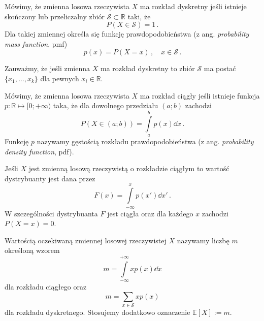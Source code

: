 \documentclass{myclass}
\numberwithin{equation}{section}
\begin{document}
\begin{definition}
Mówimy, że zmienna losowa rzeczywista \(X\) ma rozkład dyskretny jeśli istnieje skończony lub
przeliczalny zbiór \(\mathcal{S} \subset \mathbb{R}\) taki, że
\begin{equation*}
    P( X \in \mathcal{S} ) = 1\,.
\end{equation*}
Dla takiej zmiennej określa się funkcję prawdopodobieństwa (z ang. \textit{probability mass
function}, pmf)
\begin{equation*}
    p(x) = P(X = x)\,,\quad x \in \mathcal{S}\,.
\end{equation*}
\end{definition}

Zauważmy, że jeśli zmienna \(X\) ma rozkład dyskretny to zbiór \(\mathcal{S}\) ma postać
\(\{x_1,\ldots,x_k\}\) dla pewnych \(x_i \in \mathbb{R}\).

\begin{definition}
Mówimy, że zmienna losowa rzeczywista \(X\) ma rozkład ciągły jeśli istnieje funkcja \(p: \mathbb{R}
\mapsto [0; +\infty)\) taka, że dla dowolnego przedziału \((a;b)\) zachodzi
\begin{equation*}
    P(X \in (a;b)) = \int\limits_a^b p(x) \dd{x}\,.
\end{equation*}
Funkcję \(p\) nazywamy gęstością rozkładu prawdopodobieństwa (z ang. \textit{probability density
function}, pdf).
\end{definition}

Jeśli \(X\) jest zmienną losową rzeczywistą o rozkładzie ciągłym to wartość dystrybuanty jest dana
przez
\begin{equation}
    F(x) = \int\limits_{-\infty}^x p(x') \dd{x'}\,.
\end{equation}
W szczególności dystrybuanta \(F\) jest ciągła oraz dla każdego \(x\) zachodzi \(P(X = x) = 0\).

\begin{definition}
Wartością oczekiwaną zmiennej losowej rzeczywistej \(X\) nazywamy liczbę \(m\) określoną wzorem
\begin{equation*}
    m = \int\limits_{-\infty}^{+\infty} x p(x) \dd{x}
\end{equation*}
dla rozkładu ciągłego oraz
\begin{equation*}
    m = \sum_{x \in \mathcal{S}} x p(x)
\end{equation*}
dla rozkładu dyskretnego. Stosujemy dodatkowo oznaczenie \(\mathbb{E}[X] := m\).
\end{definition}
\end{document}
